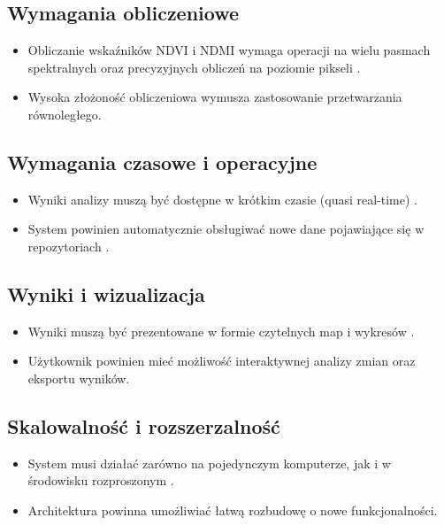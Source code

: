 \documentclass[12pt,a4paper]{article}
\begin{document}
\subsection{Wymagania obliczeniowe}
\begin{itemize}[leftmargin=*]
    \item Obliczanie wskaźników NDVI i NDMI wymaga operacji na wielu pasmach spektralnych oraz precyzyjnych obliczeń na poziomie pikseli \cite{usgs_ndvi, gdal_docs}.
    \item Wysoka złożoność obliczeniowa wymusza zastosowanie przetwarzania równoległego.
\end{itemize}

\subsection{Wymagania czasowe i operacyjne}
\begin{itemize}[leftmargin=*]
    \item Wyniki analizy muszą być dostępne w krótkim czasie (quasi real-time) \cite{sentinel_hub}.
    \item System powinien automatycznie obsługiwać nowe dane pojawiające się w repozytoriach \cite{usgs_eros}.
\end{itemize}

\subsection{Wyniki i wizualizacja}
\begin{itemize}[leftmargin=*]
    \item Wyniki muszą być prezentowane w formie czytelnych map i wykresów \cite{qgis_docs, matplotlib_docs}.
    \item Użytkownik powinien mieć możliwość interaktywnej analizy zmian oraz eksportu wyników.
\end{itemize}

\subsection{Skalowalność i rozszerzalność}
\begin{itemize}[leftmargin=*]
    \item System musi działać zarówno na pojedynczym komputerze, jak i w środowisku rozproszonym \cite{python_mp, rasterio_docs}.
    \item Architektura powinna umożliwiać łatwą rozbudowę o nowe funkcjonalności.
\end{itemize}
\end{document}
